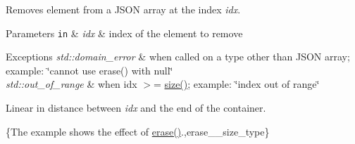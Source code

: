 Removes element from a J\-S\-O\-N array at the index {\itshape idx}.


\begin{DoxyParams}[1]{Parameters}
\mbox{\tt in}  & {\em idx} & index of the element to remove\\
\hline
\end{DoxyParams}

\begin{DoxyExceptions}{Exceptions}
{\em std\-::domain\-\_\-error} & when called on a type other than J\-S\-O\-N array; example\-: {\ttfamily \char`\"{}cannot use erase() with null\char`\"{}} \\
\hline
{\em std\-::out\-\_\-of\-\_\-range} & when {\ttfamily idx $>$= \hyperlink{classnlohmann_1_1basic__json_a0ea8a1ecca4b3cb0ba09ad7552c364b6}{size()}}; example\-: {\ttfamily \char`\"{}index out of
range\char`\"{}}\\
\hline
\end{DoxyExceptions}
Linear in distance between {\itshape idx} and the end of the container.

\{The example shows the effect of {\ttfamily \hyperlink{classnlohmann_1_1basic__json_a45e789042a23138eba2b69f34df9fc45}{erase()}}.,erase\-\_\-\-\_\-size\-\_\-type\}

